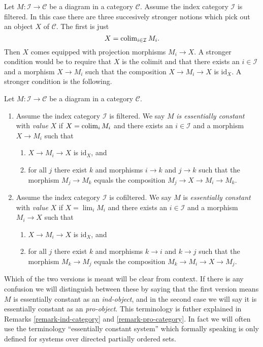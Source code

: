 \noindent
Let $M : \mathcal{I} \to \mathcal{C}$ be a diagram in a category $\mathcal{C}$.
Assume the index category $\mathcal{I}$ is filtered. In this case
there are three succesively stronger notions which pick out an object
$X$ of $\mathcal{C}$. The first is just
$$
X = \mathop{\rm colim}\nolimits_{i \in \mathcal{I}} M_i.
$$
Then $X$ comes equipped with projection morphisms $M_i \to X$.
A stronger condition would be to require that $X$ is the colimit and
that there exists an $i \in \mathcal{I}$ and a morphism $X \to M_i$ such
that the composition $X \to M_i \to X$ is $\text{id}_X$. A stronger condition
is the following.

\begin{definition}
\label{definition-essentially-constant-diagram}
Let $M : \mathcal{I} \to \mathcal{C}$ be a diagram in a category
$\mathcal{C}$.
\begin{enumerate}
\item Assume the index category $\mathcal{I}$ is filtered.
We say $M$ {\it is essentially constant} with {\it value} $X$ if
$X = \mathop{\rm colim}\nolimits_i M_i$ and there exists an $i \in \mathcal{I}$
and a morphism $X \to M_i$ such that
\begin{enumerate}
\item $X \to M_i \to X$ is $\text{id}_X$, and
\item for all $j$ there exist $k$ and morphisms $i \to k$ and $j \to k$
such that the morphism $M_j \to M_k$ equals the composition
$M_j \to X \to M_i \to M_k$.
\end{enumerate}
\item Assume the index category $\mathcal{I}$ is cofiltered. We say
$M$ is {\it essentially constant} with {\it value} $X$ if
$X = \lim_i M_i$ and there exists an $i \in \mathcal{I}$
and a morphism $M_i \to X$ such that
\begin{enumerate}
\item $X \to M_i \to X$ is $\text{id}_X$, and
\item for all $j$ there exist $k$ and morphisms $k \to i$ and $k \to j$
such that the morphism $M_k \to M_j$ equals the composition
$M_k \to M_i \to X \to M_j$.
\end{enumerate}
\end{enumerate}
\end{definition}

\noindent
Which of the two versions is meant will be clear from context. If there is
any confusion we will distinguish between these by saying that the first
version means $M$ is essentially constant as an {\it ind-object}, and in
the second case we will say it is essentially constant as an {\it pro-object}.
This terminology is futher explained in
Remarks \ref{remark-ind-category} and \ref{remark-pro-category}.
In fact we will often use the terminology ``essentially constant system''
which formally speaking is only defined for systems over directed partially
ordered sets.

